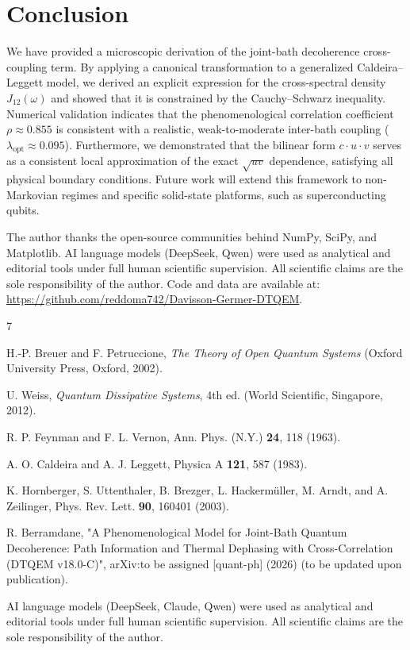 \documentclass[aps,pra,reprint,amsmath,amssymb,superscriptaddress]{revtex4-2}
\begin{document}
\section{Conclusion}
We have provided a microscopic derivation of the joint-bath decoherence cross-coupling term. By applying a canonical transformation to a generalized Caldeira--Leggett model, we derived an explicit expression for the cross-spectral density $J_{12}(\omega)$ and showed that it is constrained by the Cauchy--Schwarz inequality. Numerical validation indicates that the phenomenological correlation coefficient $\rho \approx 0.855$ is consistent with a realistic, weak-to-moderate inter-bath coupling ($\lambda_{\text{opt}} \approx 0.095$). Furthermore, we demonstrated that the bilinear form $c \cdot u \cdot v$ serves as a consistent local approximation of the exact $\sqrt{uv}$ dependence, satisfying all physical boundary conditions. Future work will extend this framework to non-Markovian regimes and specific solid-state platforms, such as superconducting qubits.

\begin{acknowledgments}
The author thanks the open-source communities behind NumPy, SciPy, and Matplotlib. AI language models (DeepSeek, Qwen) were used as analytical and editorial tools under full human scientific supervision. All scientific claims are the sole responsibility of the author. Code and data are available at: \url{https://github.com/reddoma742/Davisson-Germer-DTQEM}.
\end{acknowledgments}

\begin{thebibliography}{7}

H.-P. Breuer and F. Petruccione, \textit{The Theory of Open Quantum Systems} (Oxford University Press, Oxford, 2002).

U. Weiss, \textit{Quantum Dissipative Systems}, 4th ed. (World Scientific, Singapore, 2012).

R. P. Feynman and F. L. Vernon, Ann. Phys. (N.Y.) \textbf{24}, 118 (1963).

A. O. Caldeira and A. J. Leggett, Physica A \textbf{121}, 587 (1983).

K. Hornberger, S. Uttenthaler, B. Brezger, L. Hackerm\"uller, M. Arndt, and A. Zeilinger, Phys. Rev. Lett. \textbf{90}, 160401 (2003).

R. Berramdane, "A Phenomenological Model for Joint-Bath Quantum Decoherence: Path Information and Thermal Dephasing with Cross-Correlation (DTQEM v18.0-C)", arXiv:to be assigned [quant-ph] (2026) (to be updated upon publication).

\end{thebibliography}

\begin{acknowledgments}
AI language models (DeepSeek, Claude, Qwen) were used as analytical and editorial 
tools under full human scientific supervision. All scientific claims are the sole 
responsibility of the author.
\end{acknowledgments}
\end{document}
